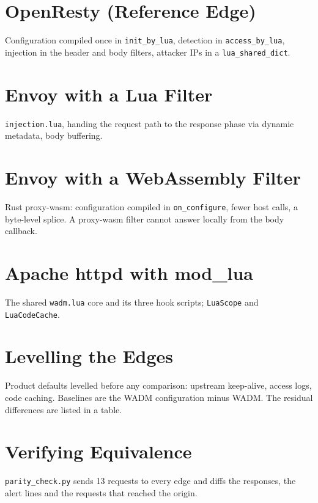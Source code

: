\documentclass{rptuma}
\begin{document}
\section{OpenResty (Reference Edge)}
Configuration compiled once in \texttt{init\_by\_lua}, detection in \texttt{access\_by\_lua},
injection in the header and body filters, attacker IPs in a \texttt{lua\_shared\_dict}.

\section{Envoy with a Lua Filter}
\texttt{injection.lua}, handing the request path to the response phase via dynamic metadata, body
buffering.

\section{Envoy with a WebAssembly Filter}
Rust proxy-wasm: configuration compiled in \texttt{on\_configure}, fewer host calls, a byte-level
splice. A proxy-wasm filter cannot answer locally from the body callback.

\section{Apache httpd with mod\_lua}
The shared \texttt{wadm.lua} core and its three hook scripts; \texttt{LuaScope} and
\texttt{LuaCodeCache}.

\section{Levelling the Edges}
\label{sec:AB.level}
Product defaults levelled before any comparison: upstream keep-alive, access logs, code caching.
Baselines are the WADM configuration minus WADM. The residual differences are listed in a table.

\section{Verifying Equivalence}
\texttt{parity\_check.py} sends 13 requests to every edge and diffs the responses, the alert lines
and the requests that reached the origin.
\end{document}
